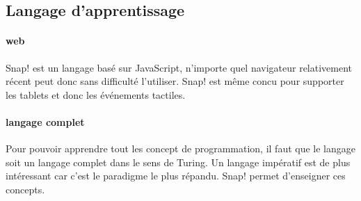 


\subsection{Langage d'apprentissage}

\paragraph{web} Snap! est un langage basé sur JavaScript, n'importe quel navigateur relativement récent peut donc sans difficulté l'utiliser. Snap! est même concu pour supporter les tablets et donc les événements tactiles.
\paragraph{langage complet} Pour pouvoir apprendre tout les concept de programmation, il faut que le langage soit un langage complet dans le sens de Turing. Un langage impératif est de plus intéressant car c'est le paradigme le plus répandu. Snap! permet d'enseigner ces concepts.
